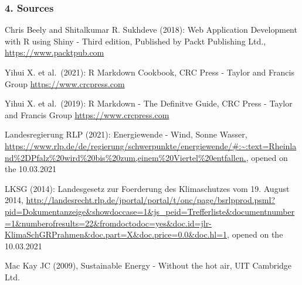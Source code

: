 \documentclass[
]{article}
\begin{document}
\hypertarget{sources}{%
\subsubsection{4. Sources}\label{sources}}

Chris Beely and Shitalkumar R. Sukhdeve (2018): Web Application
Development with R using Shiny - Third edition, Published by Packt
Publishing Ltd., \url{https://www.packtpub.com}

Yihui X. et al.~(2021): R Markdown Cookbook, CRC Press - Taylor and
Francis Group \url{https://www.crcpress.com}

Yihui X. et al.~(2019): R Markdown - The Definitve Guide, CRC Press -
Taylor and Francis Group \url{https://www.crcpress.com}

Landesregierung RLP (2021): Energiewende - Wind, Sonne Wasser,
\url{https://www.rlp.de/de/regierung/schwerpunkte/energiewende/\#:~:text=Rheinland\%2DPfalz\%20wird\%20bis\%20zum,einem\%20Viertel\%20entfallen.},
opened on the 10.03.2021

LKSG (2014): Landesgesetz zur Foerderung des Klimaschutzes vom 19.
August 2014,
\url{http://landesrecht.rlp.de/jportal/portal/t/onc/page/bsrlpprod.psml?pid=Dokumentanzeige\&showdoccase=1\&js_peid=Trefferliste\&documentnumber=1\&numberofresults=22\&fromdoctodoc=yes\&doc.id=jlr-KlimaSchGRPrahmen\&doc.part=X\&doc.price=0.0\&doc.hl=1},
opened on the 10.03.2021

Mac Kay JC (2009), Sustainable Energy - Without the hot air, UIT
Cambridge Ltd.
\end{document}
